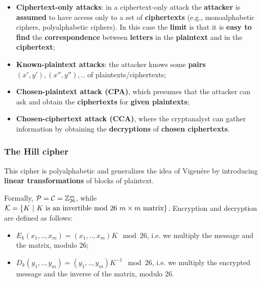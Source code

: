 \begin{itemize}
    \item \textbf{Ciphertext-only attacks}: in a ciphertext-only attack the \textbf{attacker} is \textbf{assumed} to have access only to a set of \textbf{ciphertexts} (e.g., monoalphabetic ciphers, polyalphabetic ciphers). In this case the \textbf{limit} is that it is \textbf{easy to find} the \textbf{correspondence} between \textbf{letters} in the \textbf{plaintext} and in the \textbf{ciphertext};
    \item \textbf{Known-plaintext attacks}: the attacker knows some \textbf{pairs} $(x',y'), (x'', y''), ..$ of plaintexts/ciphertexts;
    \item \textbf{Chosen-plaintext attack (CPA)}, which presumes that the attacker can ask and obtain the \textbf{ciphertexts} for \textbf{given plaintexts};
    \item \textbf{Chosen-ciphertext attack (CCA)}, where the cryptanalyst can gather information by obtaining the \textbf{decryptions} of \textbf{chosen ciphertexts}. 
\end{itemize}

\subsubsection{The Hill cipher}
This cipher is polyalphabetic and generalizes the idea of Vigenére by introducing \textbf{linear transformations} of blocks of plaintext. 

Formally, ${\cal P} = {\cal C} = \mathbb{Z}_{26}^m$, while ${\cal K} = \{ K \ | \ K  \text{ is an invertible mod 26 } m\times m \text{ matrix} \}$. Encryption and decryption are defined as follows:

\begin{itemize}
    \item $E_k (x_1, .., x_m) = (x_1, .., x_m) K \mod 26$, i.e. we multiply the message and the matrix, modulo 26;
    \item $D_k (y_1, .., y_m) = (y_1, .., y_m) K^{-1} \mod 26$, i.e. we multiply the encrypted message and the inverse of the matrix, modulo 26.
\end{itemize}

